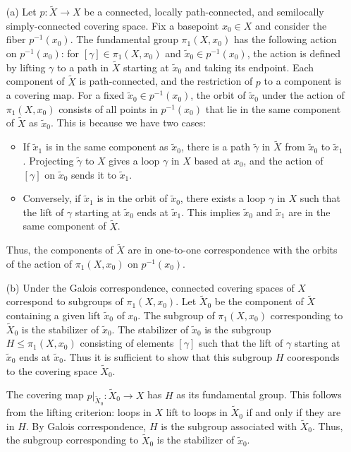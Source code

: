 \documentclass[12pt]{article}
\begin{document}
\begin{newproof}
  \begin{itemize}
    \item[(a)] Let $p: \tilde{X} \to X$ be a connected, locally path-connected, and semilocally simply-connected 
      covering space. Fix a basepoint $x_0 \in X$ and consider the fiber $p^{-1}(x_0)$. The fundamental
      group $\pi_1(X, x_0)$ has the following action  on $p^{-1}(x_0)$: for $[\gamma] \in 
      \pi_1(X, x_0)$ and $\tilde{x}_0 
      \in p^{-1}(x_0)$, the action is defined by lifting $\gamma$ to a path in $\tilde{X}$ starting at 
      $\tilde{x}_0$ and taking its endpoint. Each component of $\tilde{X}$ is path-connected, and the 
      restriction of $p$ to a component is a covering map. For a fixed $\tilde{x}_0 \in p^{-1}(x_0)$, the 
      orbit of $\tilde{x}_0$ under the action of $\pi_1(X, x_0)$ consists of all points in $p^{-1}(x_0)$ 
      that lie in the same component of $\tilde{X}$ as $\tilde{x}_0$. This is because we have two cases:
      \begin{itemize}
        \item If $\tilde{x}_1$ is in the same component as $\tilde{x}_0$, there is a path $\tilde{\gamma}$ in $\tilde{X}$ from $\tilde{x}_0$ to $\tilde{x}_1$. Projecting $\tilde{\gamma}$ to $X$ gives a loop $\gamma$ in $X$ based at $x_0$, and the action of $[\gamma]$ on $\tilde{x}_0$ sends it to $\tilde{x}_1$.
        \item Conversely, if $\tilde{x}_1$ is in the orbit of $\tilde{x}_0$, there exists a loop $\gamma$ in $X$ such that the lift of $\gamma$ starting at $\tilde{x}_0$ ends at $\tilde{x}_1$. This implies $\tilde{x}_0$ and $\tilde{x}_1$ are in the same component of $\tilde{X}$.
      \end{itemize}
      Thus, the components of $\tilde{X}$ are in one-to-one correspondence with the orbits of the action 
      of $\pi_1(X, x_0)$ on $p^{-1}(x_0)$.
    \item[(b)] Under the Galois correspondence, connected covering spaces of $X$ correspond to subgroups of
      $\pi_1(X, x_0)$. Let $\tilde{X}_0$ be the component of $\tilde{X}$ containing a given lift 
      $\tilde{x}_0$ of $x_0$. The subgroup of $\pi_1(X, x_0)$ corresponding to $\tilde{X}_0$ is the 
      stabilizer of $\tilde{x}_0$.
      The stabilizer of $\tilde{x}_0$ is the subgroup $H \leq \pi_1(X, x_0)$ consisting of elements 
      $[\gamma]$ such that the lift of $\gamma$ starting at $\tilde{x}_0$ ends at $\tilde{x}_0$. Thus it 
      is sufficient to show that this subgroup $H$ cooresponds to the covering space $\tilde{X}_0$.
      \par The covering map $p|_{\tilde{X}_0}: \tilde{X}_0 \to X$ has $H$ as its fundamental group. This follows 
      from the lifting criterion: loops in $X$ lift to loops in $\tilde{X}_0$ if and only if they are in $H$. 
      By Galois correspondence, $H$ is the subgroup associated with $\tilde{X}_0$.
      Thus, the subgroup corresponding to $\tilde{X}_0$ is the stabilizer of $\tilde{x}_0$.
  \end{itemize}
\end{newproof}
\end{document}
